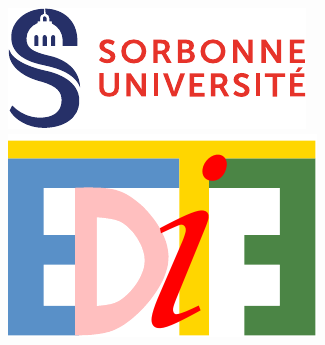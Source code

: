\thispagestyle{empty}

\hspace*{-1.15cm}
\includegraphics[keepaspectratio=true, height=.1\textheight]
                {img/logo-sorbonne.pdf}
\hfill
\includegraphics[keepaspectratio=true, height=.1\textheight]
                {img/logo-edite.pdf}
\vspace{.3cm}

